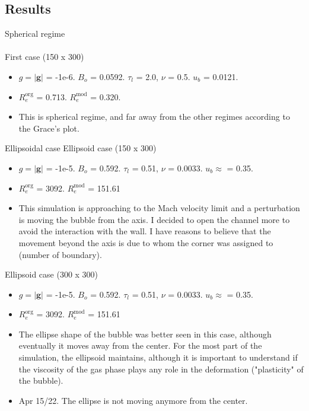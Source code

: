 \documentclass[8pt]{beamer}
\begin{document}
	\subsection{Results}
	\begin{frame}[t]{Spherical regime}
		\textbf{}\\~\\
		
		First case (150 x 300)
		\begin{itemize}
			\item $g = \vert \mathbf{g}\vert $ = -1e-6. $B_o$ = 0.0592. $\tau_l$ = 2.0, $\nu$ = 0.5. $u_b$ = 0.0121. 
			\item $R_e^{\text{org}}$ = 0.713. $R_e^{\text{mod}}$ = 0.320. 
			
			\item This is spherical regime, and far away from the other regimes according to the Grace's plot. 
		
		\end{itemize}
		
	\end{frame}
	
	\begin{frame}[t]{Ellipsoidal case}
		Ellipsoid case (150 x 300)
		\begin{itemize}
			\item $g = \vert \mathbf{g}\vert $ = -1e-5. $B_o$ = 0.592. $\tau_l$ = 0.51, $\nu$ = 0.0033. $u_b \approx$ = 0.35. 
			\item $R_e^{\text{org}}$ = 3092. $R_e^{\text{mod}}$ = 151.61
			\item This simulation is approaching to the Mach velocity limit and a perturbation is moving the bubble from the axis. I decided to open the channel more to avoid the interaction with the wall. I have reasons to believe that the movement beyond the axis is due to whom the corner was assigned to (number of boundary).
		\end{itemize}
		Ellipsoid case (300 x 300)
		\begin{itemize}
			\item $g = \vert \mathbf{g}\vert $ = -1e-5. $B_o$ = 0.592. $\tau_l$ = 0.51, $\nu$ = 0.0033. $u_b \approx$ = 0.35. 
			\item $R_e^{\text{org}}$ = 3092. $R_e^{\text{mod}}$ = 151.61
			
			\item The ellipse shape of the bubble was better seen in this case, although eventually it moves away from the center. For the most part of the simulation, the ellipsoid maintains, although it is important to understand if the viscosity of the gas phase plays any role in the deformation ("plasticity" of the bubble).
			
			\item Apr 15/22. The ellipse is not moving anymore from the center. 
		\end{itemize}
	\end{frame}
\end{document}

